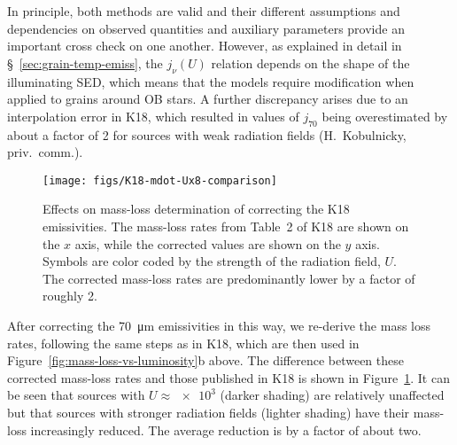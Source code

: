 \documentclass[useAMS, usenatbib, a4paper]{mnras}
\begin{document}
In principle, both methods are valid and their different assumptions
and dependencies on observed quantities and auxiliary parameters
provide an important cross check on one another.  However, as
explained in detail in \S~\ref{sec:grain-temp-emiss}, the \(j_\nu(U)\)
relation depends on the shape of the illuminating SED, which means
that the \citet{Draine:2007a} models require modification when applied
to grains around OB stars.  A further discrepancy arises due to an
interpolation error in K18, which resulted in values of \(j_{70}\)
being overestimated by about a factor of 2 for sources with weak
radiation fields (H.~Kobulnicky, priv.~comm.).






\begin{figure}
  \centering
  \texttt{[image: figs/K18-mdot-Ux8-comparison]}
  \caption{Effects on mass-loss determination of correcting the K18
    emissivities.  The mass-loss rates from Table~2 of K18 are shown
    on the \(x\) axis, while the corrected values are shown on the
    \(y\) axis.  Symbols are color coded by the strength of the
    radiation field, \(U\). The corrected mass-loss rates are
    predominantly lower by a factor of roughly 2.}
  \label{fig:k18-mdot-corrected-emissivity}
\end{figure}

After correcting the \SI{70}{\um} emissivities in this way, we
re-derive the mass loss rates, following the same steps as in K18,
which are then used in Figure~\ref{fig:mass-loss-vs-luminosity}b
above.  The difference between these corrected mass-loss rates and
those published in K18 is shown in
Figure~\ref{fig:k18-mdot-corrected-emissivity}.  It can be seen that
sources with \(U \approx \num{e3}\) (darker shading) are relatively
unaffected but that sources with stronger radiation fields (lighter
shading) have their mass-loss increasingly reduced.
The average reduction is by a factor of about two.
\end{document}
